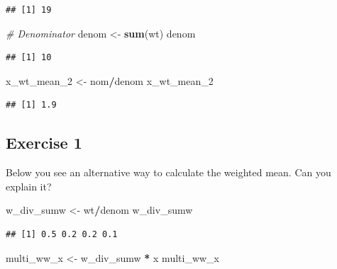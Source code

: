 \documentclass[
  doc]{apa6}
\newenvironment{Shaded}{\begin{snugshade}}{\end{snugshade}}
\newcommand{\CommentTok}[1]{\textcolor[rgb]{0.56,0.35,0.01}{\textit{#1}}}
\newcommand{\FunctionTok}[1]{\textcolor[rgb]{0.13,0.29,0.53}{\textbf{#1}}}
\newcommand{\NormalTok}[1]{#1}
\newcommand{\OtherTok}[1]{\textcolor[rgb]{0.56,0.35,0.01}{#1}}
\newcommand{\SpecialCharTok}[1]{\textcolor[rgb]{0.81,0.36,0.00}{\textbf{#1}}}
\begin{document}
\begin{verbatim}
## [1] 19
\end{verbatim}

\begin{Shaded}
\begin{Highlighting}[]
\CommentTok{\# Denominator}
\NormalTok{denom }\OtherTok{\textless{}{-}} \FunctionTok{sum}\NormalTok{(wt)}
\NormalTok{denom}
\end{Highlighting}
\end{Shaded}

\begin{verbatim}
## [1] 10
\end{verbatim}

\begin{Shaded}
\begin{Highlighting}[]
\NormalTok{x\_wt\_mean\_2 }\OtherTok{\textless{}{-}}\NormalTok{ nom}\SpecialCharTok{/}\NormalTok{denom}
\NormalTok{x\_wt\_mean\_2}
\end{Highlighting}
\end{Shaded}

\begin{verbatim}
## [1] 1.9
\end{verbatim}

\newpage

\hypertarget{exercise-1}{%
\subsection{Exercise 1}\label{exercise-1}}

Below you see an alternative way to calculate the weighted mean. Can you explain it?

\begin{Shaded}
\begin{Highlighting}[]
\NormalTok{w\_div\_sumw }\OtherTok{\textless{}{-}}\NormalTok{ wt}\SpecialCharTok{/}\NormalTok{denom}
\NormalTok{w\_div\_sumw}
\end{Highlighting}
\end{Shaded}

\begin{verbatim}
## [1] 0.5 0.2 0.2 0.1
\end{verbatim}

\begin{Shaded}
\begin{Highlighting}[]
\NormalTok{multi\_ww\_x }\OtherTok{\textless{}{-}}\NormalTok{ w\_div\_sumw }\SpecialCharTok{*}\NormalTok{ x}
\NormalTok{multi\_ww\_x}
\end{Highlighting}
\end{Shaded}
\end{document}
